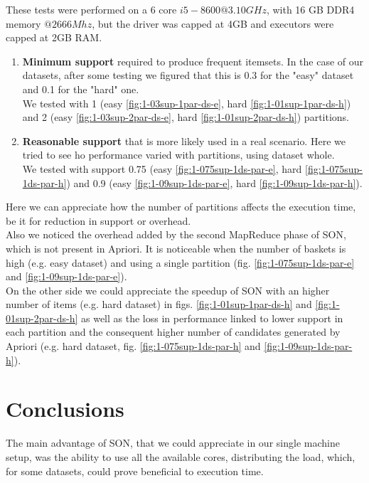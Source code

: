 \documentclass[a4paper]{article}
\begin{document}
	These tests were performed on a 6 core $i5-8600 @3.10GHz$, with 16 GB DDR4 memory $@2666Mhz$, but the driver was capped at 4GB and executors were capped at 2GB RAM.
	\begin{enumerate}
		\item \textbf{Minimum support} required to produce frequent itemsets. In the case of our datasets, after some testing we figured that this is 0.3 for the "easy" dataset and 0.1 for the "hard" one.\\
		We tested with 1 (easy \ref{fig:1-03sup-1par-ds-e}, hard \ref{fig:1-01sup-1par-ds-h}) and 2 (easy \ref{fig:1-03sup-2par-ds-e}, hard \ref{fig:1-01sup-2par-ds-h}) partitions.
		\item \textbf{Reasonable support} that is more likely used in a real scenario. Here we tried to see ho performance varied with partitions, using dataset whole.\\
		We tested with support 0.75 (easy \ref{fig:1-075sup-1ds-par-e}, hard \ref{fig:1-075sup-1ds-par-h}) and 0.9 (easy \ref{fig:1-09sup-1ds-par-e}, hard \ref{fig:1-09sup-1ds-par-h}).

	\end{enumerate}

	Here we can appreciate how the number of partitions affects the execution time, be it for reduction in support or overhead.\\
	
	Also we noticed the overhead added by the second MapReduce phase of SON, which is not present in Apriori. It is noticeable when the number of baskets is high (e.g. easy dataset) and using a single
	partition (fig. \ref{fig:1-075sup-1ds-par-e} and \ref{fig:1-09sup-1ds-par-e}).\\

	On the other side we could appreciate the speedup of SON with an higher number of items (e.g. hard dataset) in figs. \ref{fig:1-01sup-1par-ds-h} and \ref{fig:1-01sup-2par-ds-h}
	as well as the loss in performance linked to lower support in each partition and the consequent higher number of candidates generated by Apriori (e.g. hard dataset, fig. \ref{fig:1-075sup-1ds-par-h} and \ref{fig:1-09sup-1ds-par-h}).

	
	\section{Conclusions}
	The main advantage of SON, that we could appreciate in our single machine setup, was the ability to use all the available cores, distributing the load, which, for some datasets, could prove beneficial to execution time.\\
\end{document}
